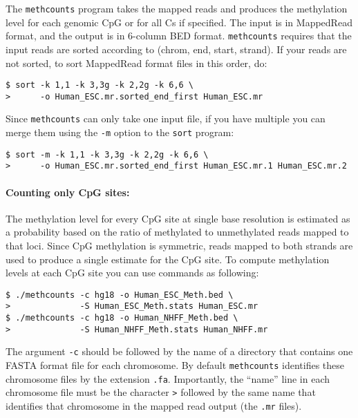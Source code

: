 \documentclass[10pt]{article}
\newcommand{\prog}[1]{\texttt{#1}}
\newcommand{\fn}[1]{\texttt{#1}}
\newcommand{\lit}[1]{\texttt{#1}}
\newcommand{\op}[1]{\texttt{#1}}
\begin{document}
The \prog{methcounts} program takes the mapped reads and produces the
methylation level for each genomic CpG or for all Cs if specified.
The input is in MappedRead format, and the output is in 6-column BED
format. \prog{methcounts} requires that the input reads are sorted
according to (chrom, end, start, strand). If your reads are not
sorted, to sort MappedRead format files in this order, do:
\begin{verbatim}
$ sort -k 1,1 -k 3,3g -k 2,2g -k 6,6 \
>      -o Human_ESC.mr.sorted_end_first Human_ESC.mr
\end{verbatim}
Since \prog{methcounts} can only take one input file, if you have
multiple you can merge them using the \op{-m} option to the
\prog{sort} program:
\begin{verbatim}
$ sort -m -k 1,1 -k 3,3g -k 2,2g -k 6,6 \
>      -o Human_ESC.mr.sorted_end_first Human_ESC.mr.1 Human_ESC.mr.2
\end{verbatim}

\paragraph{Counting only CpG sites:}
The methylation level for every CpG site at single base resolution is
estimated as a probability based on the ratio of methylated to
unmethylated reads mapped to that loci. Since CpG methylation is
symmetric, reads mapped to both strands are used to produce a single
estimate for the CpG site. To compute methylation levels at each CpG
site you can use commands as following:
\begin{verbatim}
$ ./methcounts -c hg18 -o Human_ESC_Meth.bed \
>              -S Human_ESC_Meth.stats Human_ESC.mr
$ ./methcounts -c hg18 -o Human_NHFF_Meth.bed \
>              -S Human_NHFF_Meth.stats Human_NHFF.mr
\end{verbatim}
The argument \op{-c} should be followed by the name of a directory
that contains one FASTA format file for each chromosome. By default
\prog{methcounts} identifies these chromosome files by the extension
\fn{.fa}. Importantly, the ``name'' line in each chromosome file must
be the character \lit{>} followed by the same name that identifies
that chromosome in the mapped read output (the \fn{.mr} files).
\end{document}
